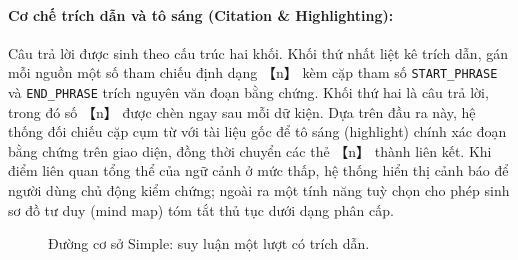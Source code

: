 \documentclass[11pt]{article}
\begin{document}
\paragraph{Cơ chế trích dẫn và tô sáng (Citation \& Highlighting): }
Câu trả lời được sinh theo cấu trúc hai khối. Khối thứ nhất liệt kê trích dẫn, gán mỗi nguồn
một số tham chiếu định dạng 【n】 kèm cặp tham số \texttt{START\_PHRASE} và \texttt{END\_PHRASE}
trích nguyên văn đoạn bằng chứng. Khối thứ hai là câu trả lời, trong đó số 【n】 được chèn ngay
sau mỗi dữ kiện. Dựa trên đầu ra này, hệ thống đối chiếu cặp cụm từ với tài liệu gốc để tô
sáng (highlight) chính xác đoạn bằng chứng trên giao diện, đồng thời chuyển các thẻ 【n】 thành
liên kết. Khi điểm liên quan tổng thể của ngữ cảnh ở mức thấp, hệ thống hiển thị cảnh báo để
người dùng chủ động kiểm chứng; ngoài ra một tính năng tuỳ chọn cho phép sinh sơ đồ tư duy
(mind map) tóm tắt thủ tục dưới dạng phân cấp.

\begin{figure}[H]
\centering
{}
\caption{Đường cơ sở Simple: suy luận một lượt có trích dẫn.}
\label{fig:w2-rag}
\end{figure}

\end{document}

